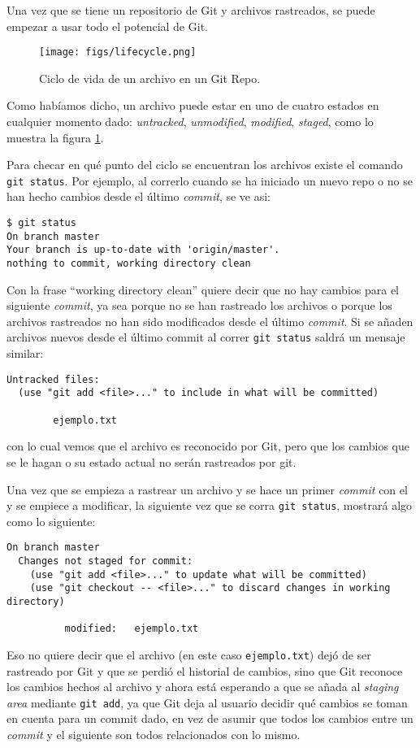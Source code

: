 \documentclass[spanish, 12pt, a4paper]{article}
\begin{document}
Una vez que se tiene un repositorio de Git y archivos rastreados, se
puede empezar a usar todo el potencial de Git.

\begin{figure}
  \centering
  \texttt{[image: figs/lifecycle.png]}
  \caption{Ciclo de vida de un archivo en un Git Repo.}
  \label{fig:lifecycle}
\end{figure}

Como habíamos dicho, un archivo puede estar en uno de cuatro estados en
cualquier momento dado: \textit{untracked}, \textit{unmodified},
\textit{modified}, \textit{staged}, como lo muestra la figura
\ref{fig:lifecycle}.

Para checar en qué punto del ciclo se encuentran los archivos existe el comando
\texttt{git status}.
Por ejemplo, al correrlo cuando se ha iniciado un nuevo repo o no se han hecho
cambios desde el último \textit{commit}, se ve asi:

\begin{lstlisting}
$ git status
On branch master
Your branch is up-to-date with 'origin/master'.
nothing to commit, working directory clean
\end{lstlisting}

Con la frase ``working directory clean'' quiere decir que no hay cambios para el
siguiente \textit{commit}, ya sea porque no se han rastreado los archivos o
porque los archivos rastreados no han sido modificados desde el último
\textit{commit}.
Si se añaden archivos nuevos desde el último commit al correr \texttt{git
status} saldrá un mensaje similar:
\begin{lstlisting}
Untracked files:
  (use "git add <file>..." to include in what will be committed)

		ejemplo.txt
\end{lstlisting}
con lo cual vemos que el archivo es reconocido por Git, pero que los cambios que
se le hagan o su estado actual no serán rastreados por git.

Una vez que se empieza a rastrear un archivo y se hace un primer \textit{commit}
con el y se empiece a modificar, la siguiente vez que se corra \texttt{git
status}, mostrará algo como lo siguiente:
\begin{lstlisting}
On branch master
  Changes not staged for commit:
	(use "git add <file>..." to update what will be committed)
	(use "git checkout -- <file>..." to discard changes in working directory)

		  modified:   ejemplo.txt
\end{lstlisting}
Eso no quiere decir que el archivo (en este caso \texttt{ejemplo.txt}) dejó de
ser rastreado por Git y que se perdió el historial de cambios, sino que Git
reconoce los cambios hechos al archivo y ahora está esperando a que se añada al
\textit{staging area} mediante \texttt{git add}, ya que Git deja al usuario
decidir qué cambios se toman en cuenta para un commit dado, en vez de asumir que
todos los cambios entre un \textit{commit} y el siguiente son todos relacionados
con lo mismo.
\end{document}
